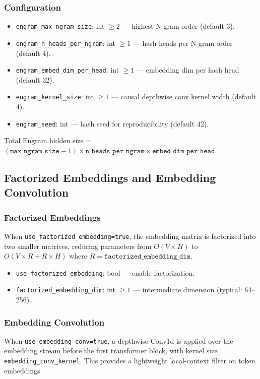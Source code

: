 \subsubsection{Configuration}
\begin{itemize}[leftmargin=*]
    \item \texttt{engram\_max\_ngram\_size}: int $\ge 2$ --- highest N-gram order (default 3).
    \item \texttt{engram\_n\_heads\_per\_ngram}: int $\ge 1$ --- hash heads per N-gram order (default 4).
    \item \texttt{engram\_embed\_dim\_per\_head}: int $\ge 1$ --- embedding dim per hash head (default 32).
    \item \texttt{engram\_kernel\_size}: int $\ge 1$ --- causal depthwise conv kernel width (default 4).
    \item \texttt{engram\_seed}: int --- hash seed for reproducibility (default 42).
\end{itemize}
Total Engram hidden size = $(\texttt{max\_ngram\_size} - 1) \times \texttt{n\_heads\_per\_ngram} \times \texttt{embed\_dim\_per\_head}$.

\subsection{Factorized Embeddings and Embedding Convolution}

\subsubsection{Factorized Embeddings}
When \texttt{use\_factorized\_embedding=true}, the embedding matrix is factorized into two smaller matrices, reducing parameters from $O(V \times H)$ to $O(V \times R + R \times H)$ where $R = \texttt{factorized\_embedding\_dim}$.
\begin{itemize}[leftmargin=*]
    \item \texttt{use\_factorized\_embedding}: bool --- enable factorization.
    \item \texttt{factorized\_embedding\_dim}: int $\ge 1$ --- intermediate dimension (typical: 64--256).
\end{itemize}

\subsubsection{Embedding Convolution}
When \texttt{use\_embedding\_conv=true}, a depthwise Conv1d is applied over the embedding stream before the first transformer block, with kernel size \texttt{embedding\_conv\_kernel}. This provides a lightweight local-context filter on token embeddings.

